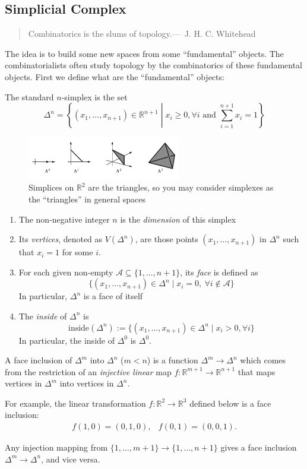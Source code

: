 \subsection{Simplicial Complex}
\begin{quotation}
Combinatorics is the slums of topology.\qquad\quad---~J. H. C. Whitehead
\end{quotation}
The idea is to build some new spaces from some ``fundamental'' objects.
The combinatorialists often study topology by the combinatorics of these fundamental objects.
First we define what are the ``fundamental'' objects:

\begin{definition}[$n$-simplex]
The standard $n$-simplex is the set
\[
\Delta^n = \left\{(x_1,\dots,x_{n+1})\in\mathbb{R}^{n+1}\middle| x_i\ge0,\forall i\text{ and } \sum_{i=1}^{n+1}x_i=1\right\}
\]
\begin{figure}[H]
\centering
\includegraphics[width=0.6\textwidth]{week7/p_2}
\caption{Simplices on $\mathbb{R}^2$ are the triangles, so you may consider simplexes as the ``triangles'' in general spaces}
\end{figure}
\begin{enumerate}
\item
The non-negative integer $n$ is the \emph{dimension} of this simplex
\item
Its \emph{vertices}, denoted as $V(\Delta^n)$, are those points $(x_1,\dots,x_{n+1})$ in $\Delta^n$ such that $x_i=1$ for some $i$.
\item
For each given non-empty $\mathcal{A}\subseteq\{1,\dots,n+1\}$, its \emph{face} is defined as
\[
\{(x_1,\dots,x_{n+1})\in\Delta^n\mid x_i=0,\ \forall i\notin\mathcal{A}\}
\]
In particular, $\Delta^n$ is a face of itself
\item
The \emph{inside} of $\Delta^n$ is
\[
\text{inside}(\Delta^n):=\{(x_1,\dots,x_{n+1})\in\Delta^n\mid x_i>0,\forall i\}
\]
In particular, the inside of $\Delta^0$ is $\Delta^0$.
\end{enumerate}
\end{definition}

\begin{definition}
A face inclusion of $\Delta^m$ into $\Delta^n$ ($m<n$) is a function 
$\Delta^m\to\Delta^n$ which comes from the restriction of an \emph{injective linear} map
$f:\mathbb{R}^{m+1}\to\mathbb{R}^{n+1}$ that maps vertices in $\Delta^m$ into vertices in $\Delta^n$.
\end{definition}
For example, the linear transformation $f:\mathbb{R}^2\to\mathbb{R}^3$ defined below is a face inclusion:
\[
\begin{array}{ll}
f(1,0)=(0,1,0),
&
f(0,1)=(0,0,1).
\end{array}
\]
\begin{remark}
Any injection mapping from $\{1,\dots,m+1\}\to\{1,\dots,n+1\}$ gives a face inclusion $\Delta^m\to\Delta^n$, and vice versa.
\end{remark}

